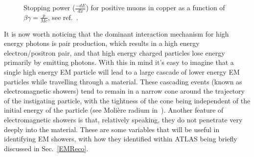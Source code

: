 \begin{figure}[!ht]
    \begin{center}
    \end{center}
        \caption[Stopping power for positive muons in copper.]
        {\small Stopping power ($\frac{-dE}{dx}$) for positive muons in copper as a function of $\beta\gamma=\frac{p}{Mc}$, see ref.~\cite{PDG}.} 
            \label{StoppingMuon}
\end{figure}

It is now worth noticing that the dominant interaction mechanism for high energy photons is pair production, which results in a high energy electron/positron pair, and that high energy charged particles lose energy primarily by emitting photons.  
With this in mind it's easy to imagine that a single high energy EM particle will lead to a large cascade of lower energy EM particles while travelling through a material.  
These cascading events (known as electromagnetic showers) tend to remain in a narrow cone around the trajectory of the instigating particle, with the tightness of the cone being independent of the initial energy of the particle (see Moli{\`e}re radium in~\cite{grupen_shwartz_2011}).  
Another feature of electromagnetic showers is that, relatively speaking, they do not penetrate very deeply into the material.   
These are some variables that will be useful in identifying EM showers, with how they identified within ATLAS being briefly discussed in Sec.~\ref{EMReco}. 

